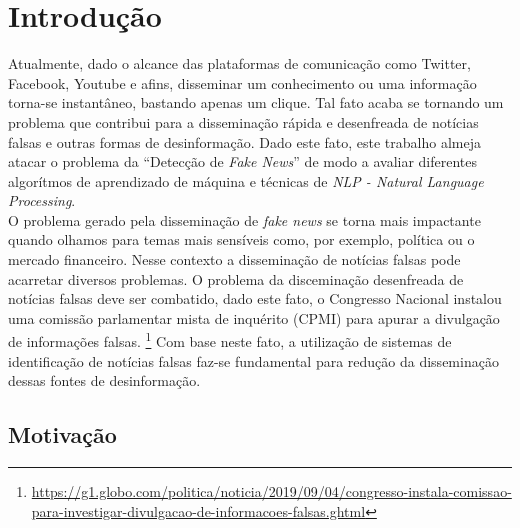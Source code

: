 \section{Introdução}

Atualmente, dado o alcance das plataformas de comunicação como Twitter, Facebook, Youtube e afins, disseminar um conhecimento ou uma informação torna-se instantâneo, bastando apenas um clique. Tal fato acaba se tornando um problema que contribui para a disseminação rápida e desenfreada de notícias falsas e outras formas de desinformação. Dado este fato, este trabalho almeja atacar o problema da ``Detecção de \textit{Fake News}'' de modo a avaliar diferentes algorítmos de aprendizado de máquina e técnicas de \textit{NLP - \textit{Natural Language Processing}}. \\


O problema gerado pela disseminação de \textit{fake news} se torna mais impactante quando olhamos para temas mais sensíveis como, por exemplo, política ou o mercado financeiro. Nesse contexto a disseminação de notícias falsas pode acarretar diversos problemas. O problema da disceminação desenfreada de notícias falsas deve ser combatido, dado este fato, o Congresso Nacional instalou uma comissão parlamentar mista de inquérito (CPMI)  para apurar a divulgação de informações falsas. \footnote{\url{https://g1.globo.com/politica/noticia/2019/09/04/congresso-instala-comissao-para-investigar-divulgacao-de-informacoes-falsas.ghtml}} Com base neste fato, a utilização de sistemas de identificação de notícias falsas faz-se fundamental para redução da disseminação dessas fontes de desinformação.



\subsection{Motivação}

